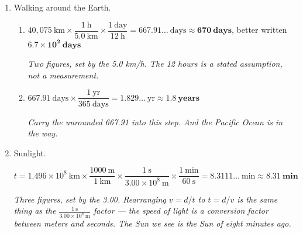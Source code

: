 \documentclass[12pt, twoside]{article}
\begin{document}
\begin{enumerate}[itemsep=0.3cm]
\begin{enumerate}[itemsep=0.15cm]
      \emph{Dividing the powers of ten: $10^{-3-(-10)} = 10^{7}$, and $1.0/2 = 0.5$. The
      units work too: $\text{m}^3 / \text{m} = \text{m}^2$.}
    \item $\pi r^2 = 5 \times 10^{6}~\text{m}^2$, so
      $r = \sqrt{\dfrac{5 \times 10^{6}~\text{m}^2}{\pi}} = 1261.5\ldots~\text{m}$
      and $d = 2r = 2523\ldots~\text{m} \approx$ \textbf{2.5 km} (about 3 km)

      \emph{The molecule size has one significant figure, so this is an estimate: ``a
      couple of kilometers'' is the physics. Franklin's teaspoon covered about half an
      acre. In 1890 Lord Rayleigh repeated the experiment carefully and used it to make
      one of the first estimates of the size of a molecule.}
  \end{enumerate}

\item Walking around the Earth.
  \begin{enumerate}[itemsep=0.15cm]
    \item $40{,}075~\text{km} \times \dfrac{1~\text{h}}{5.0~\text{km}}
      \times \dfrac{1~\text{day}}{12~\text{h}} = 667.91\ldots~\text{days}
      \approx \mathbf{670~\textbf{days}}$, better written
      $\mathbf{6.7 \times 10^{2}~\textbf{days}}$

      \emph{Two figures, set by the 5.0 km/h. The 12 hours is a stated assumption,
      not a measurement.}
    \item $667.91~\text{days} \times \dfrac{1~\text{yr}}{365~\text{days}}
      = 1.829\ldots~\text{yr} \approx \mathbf{1.8~\textbf{years}}$

      \emph{Carry the unrounded 667.91 into this step. And the Pacific Ocean is in the
      way.}
  \end{enumerate}

\item Sunlight.

  $t = 1.496 \times 10^{8}~\text{km} \times \dfrac{1000~\text{m}}{1~\text{km}}
  \times \dfrac{1~\text{s}}{3.00 \times 10^{8}~\text{m}}
  \times \dfrac{1~\text{min}}{60~\text{s}}
  = 8.3111\ldots~\text{min} \approx \mathbf{8.31~\textbf{min}}$

  \emph{Three figures, set by the 3.00. Rearranging $v = d/t$ to $t = d/v$ is the same
  thing as the $\frac{1~\text{s}}{3.00 \times 10^{8}~\text{m}}$ factor --- the speed of
  light is a conversion factor between meters and seconds. The Sun we see is the Sun
  of eight minutes ago.}

\end{enumerate}
\end{document}
